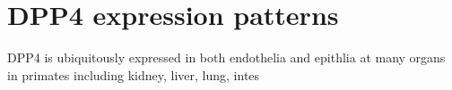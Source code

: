 \section{DPP4 expression patterns}
DPP4 is ubiquitously expressed in both endothelia and epithlia at many organs in primates including kidney, liver, lung, intes
